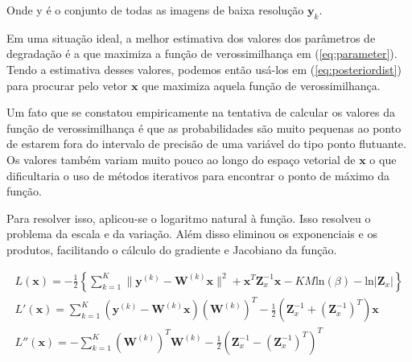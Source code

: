 Onde y é o conjunto de todas as imagens de baixa resolução $\mathbf{y}_k$.

Em uma situação ideal, a melhor estimativa dos valores dos parâmetros de degradação é a que maximiza a função de verossimilhança em (\ref{eq:parameter}).
Tendo a estimativa desses valores, podemos então usá-los em (\ref{eq:posteriordist}) para procurar pelo vetor $\mathbf{x}$ que maximiza aquela função de verossimilhança.

Um fato que se constatou empiricamente na tentativa de calcular os valores da função de verossimilhança é que as probabilidades são muito pequenas ao ponto de estarem fora do intervalo de precisão de uma variável do tipo ponto flutuante.
Os valores também variam muito pouco ao longo do espaço vetorial de $\mathbf{x}$ o que dificultaria o uso de métodos iterativos para encontrar o ponto de máximo da função.

Para resolver isso, aplicou-se o logaritmo natural à função. Isso resolveu o problema da escala e da variação.
Além disso eliminou os exponenciais e os produtos, facilitando o cálculo do gradiente e Jacobiano da função.

\begin{gather}
	L(\mathbf{x}) = -\frac{1}{2} \left\{ \sum^K_{k=1} \|\mathbf{y}^{(k)} - \mathbf{W}^{(k)} \mathbf{x} \|^2 + \mathbf{x}^T\mathbf{Z}^{-1}_x\mathbf{x} - KM\mathrm{ln}(\beta) - \mathrm{ln}|\mathbf{Z}_x| \right\} \\ 
	L'(\mathbf{x}) =  \sum^K_{k=1}  (\mathbf{y}^{(k)} - \mathbf{W}^{(k)}\mathbf{x})(\mathbf{W}^{(k)})^T  - \frac{1}{2}(\mathbf{Z}^{-1}_x + (\mathbf{Z}^{-1}_x)^T)\mathbf{x}  \\
	L''(\mathbf{x}) =  -\sum^K_{k=1} (\mathbf{W}^{(k)})^T\mathbf{W}^{(k)} - \frac{1}{2}(\mathbf{Z}^{-1}_x - (\mathbf{Z}^{-1}_x)^T)^T
\end{gather}


